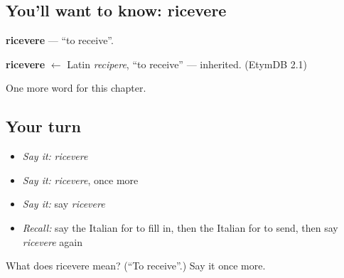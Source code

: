 \subsection*{You'll want to know: ricevere}
\textbf{ricevere} — \textquotedblleft{}to receive\textquotedblright{}.

\begin{cousinweb}
\textbf{ricevere} $\leftarrow$ Latin \emph{recipere}, \textquotedblleft{}to receive\textquotedblright{} — inherited. (EtymDB 2.1)
\end{cousinweb}

\begin{grammarlens}[title={What you've built}]
One more word for this chapter.
\end{grammarlens}

\subsection*{Your turn}
\begin{itemize}
\raggedright
  \item \emph{Say it:} \emph{ricevere}
  \item \emph{Say it:} \emph{ricevere}, once more
  \item \emph{Say it:} say \emph{ricevere}
  \item \emph{Recall:} say the Italian for to fill in, then the Italian for to send, then say \emph{ricevere} again
\end{itemize}

\begin{tcolorbox}[breakable,colback=teal!4,colframe=teal!35!black,title={Before you move on}]
What does ricevere mean? (\textquotedblleft{}To receive\textquotedblright{}.) Say it once more.
\end{tcolorbox}
